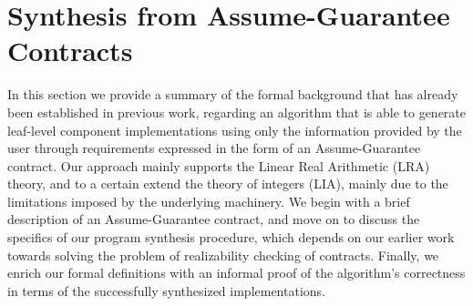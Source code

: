 \newcommand{\realizable}{\textsc{realizable}}
\newcommand{\unrealizable}{\textsc{unrealizable}}
\newcommand{\skolems}{\textit{Skolems}}

\newcommand{\synthesisalgorithm}{
\begin{algorithm2e}[]
\SetAlgoSkip{}
\SetKwFor{While}{forever}{do}{}
\SetKw{KwContinue}{continue}
\KwIn{Assume-Guarantee Contract in Lustre, $(A,G)$}
\KwOut{Skolem collection \skolems, \\ \hspace{+1.3cm} Return value $\in
\{\realizable, \unrealizable\}$ of ${(A,G)}$.}
\BlankLine
$i \gets 0$;\\
$\textsc{BaseCheckEngine.SmtAdd}(\lnot BaseCheck(i))$;
$\textsc{ExtendCheckEngine.SmtAdd}(\lnot ExtendCheck(i))$;
\\
\While{}{
	$i$++;\\
	\lIf(\label{alg:returnUnsat}){$(BaseCheckEngine.\isSat(\textsc{SmtSolve}()))$}
	{
		\Return
		\unrealizable 
	}
	$\textsc{SkolemsAdd}(\aeval(BaseCheck(i))$;\\
	\lIf(\label{alg:returnSat}){$(ExtendCheckEngine.\isUnSat(\textsc{SmtSolve}()))$}
	{
		$\textsc{SkolemsAdd}(\aeval(ExtendCheck(i)))$;\\
		\Return \skolems, \realizable
	}
}
\caption{Synthesis from Assume-Guarantee Contracts}
\label{alg:synthesis}
\end{algorithm2e}
}


\section{Synthesis from Assume-Guarantee Contracts}
\label{sec:synthesis}

In this section we provide a summary of the formal background
that has already been established in previous work, regarding an algorithm that
is able to generate leaf-level component implementations using only the
information provided by the user through requirements expressed in the form of an
Assume-Guarantee contract. Our approach mainly supports the Linear Real
Arithmetic (LRA) theory, and to a certain extend the theory of integers (LIA),
mainly due to the limitations imposed by the underlying machinery. We
begin with a brief description of an Assume-Guarantee contract, and
move on to discuss the specifics of our program synthesis procedure,
which depends on our earlier work towards solving the problem of realizability
checking of contracts.
Finally, we enrich our formal definitions with an informal proof of the
algorithm's correctness in terms of the successfully synthesized
implementations.

